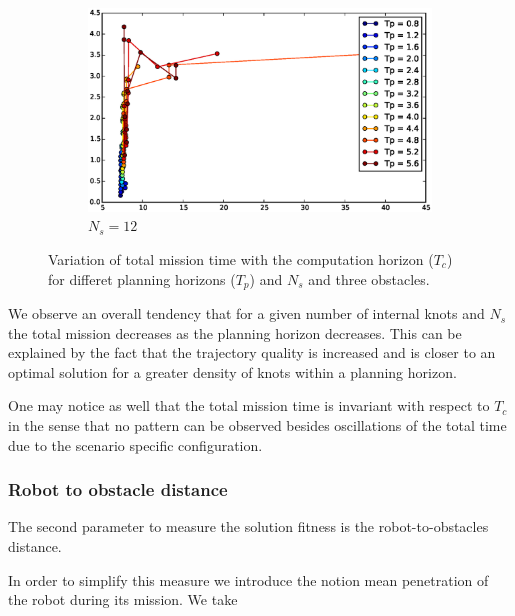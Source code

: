 \begin{figure}[!h]
        ~ %
        \begin{subfigure}[b]{0.48\textwidth}
                \includegraphics[width=\textwidth]{./img/realtime/Scenario_3__N_knots_6/tot12.eps}
                \caption{$N_s = 12$}\label{fig:ttot3}
        \end{subfigure}
        \caption{Variation of total mission time with the computation horizon ($T_c$) for differet planning horizons ($T_p$) and $N_s$ and three obstacles.}\label{fig:ttot}
\end{figure}

We observe an overall tendency that for a given number of internal knots and $N_s$ the total mission decreases as the planning horizon decreases. This can be explained by the fact that the trajectory quality is increased and is closer to an optimal solution for a greater density of knots within a planning horizon.

One may notice as well that the total mission time is invariant with respect to $T_c$ in the sense that no pattern can be observed besides oscillations of the total time due to the scenario specific configuration.


\subsubsection{Robot to obstacle distance}

The second parameter to measure the solution fitness is the robot-to-obstacles distance.

In order to simplify this measure we introduce the notion mean penetration of the robot during its mission.
We take 

